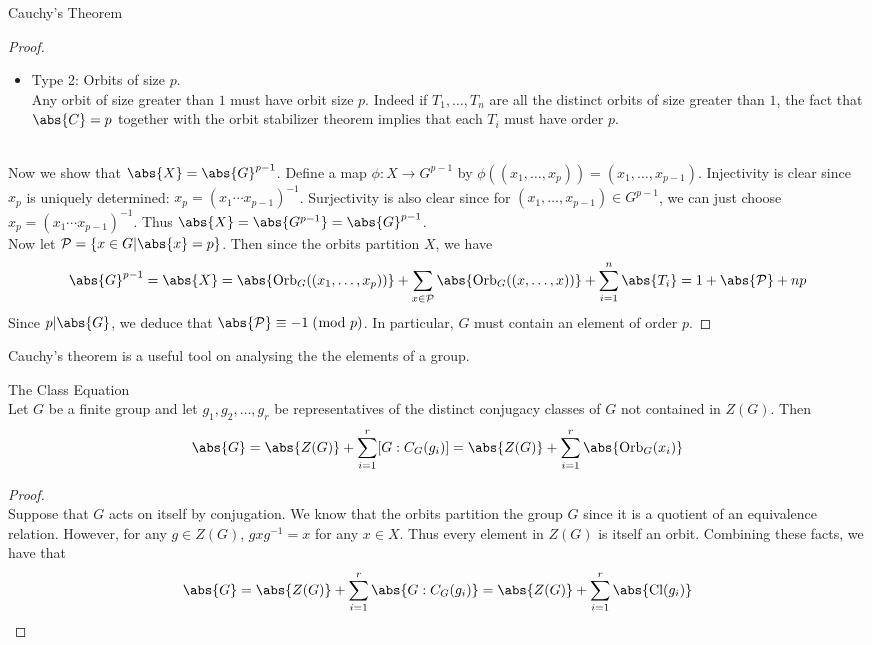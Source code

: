 \documentclass[a4paper]{article}
\begin{document}
\begin{thm}{Cauchy's Theorem}{}
\begin{proof}
\begin{itemize}
In fact, every orbit of size $1$ must be one of the above two cases. Suppose that $S$ is an orbit of size $1$. Let $(x_1,\dots,x_p)\in X$. Then the orbit stabilizer theorem implies that $\text{Stab}_C((x_1,\dots,x_p))=C$. Since $f=(1,\dots,p)\in C$, we have 
\begin{align*}
(x_1,\dots,x_p)&=f\cdot(x_1,\dots,x_p)\tag{$f\in\text{Stab}_C((x_1,\dots,x_p))$}\\
&=(x_2,\dots,x_p,x_1)
\end{align*} which means that $x_1=\dots=x_p$. This means that $x_1^p=1$. Since $p$ is a prime this means that $\abs{x_1}=1$ or $p$. In which either way it falls into one of the two above cases. 
\item Type 2: Orbits of size $p$. \\
Any orbit of size greater than $1$ must have orbit size $p$. Indeed if $T_1,\dots,T_n$ are all the distinct orbits of size greater than $1$, the fact that $\abs{C}=p$ together with the orbit stabilizer theorem implies that each $T_i$ must have order $p$. 
\end{itemize}~\\
Now we show that $\abs{X}=\abs{G}^{p-1}$. Define a map $\phi:X\to G^{p-1}$ by $\phi((x_1,\dots,x_p))=(x_1,\dots,x_{p-1})$. Injectivity is clear since $x_p$ is uniquely determined: $x_p=(x_1\cdots x_{p-1})^{-1}$. Surjectivity is also clear since for $(x_1,\dots,x_{p-1})\in G^{p-1}$, we can just choose $x_p=(x_1\cdots x_{p-1})^{-1}$. Thus $\abs{X}=\abs{G^{p-1}}=\abs{G}^{p-1}$. \\

Now let $\mathcal{P}=\{x\in G|\abs{x}=p\}$. Then since the orbits partition $X$, we have $$\abs{G}^{p-1}=\abs{X}=\abs{\text{Orb}_G((x_1,\dots,x_p))}+\sum_{x\in\mathcal{P}}\abs{\text{Orb}_G((x,\dots,x))}+\sum_{i=1}^n\abs{T_i}=1+\abs{\mathcal{P}}+np$$ Since $p|\abs{G}$, we deduce that $\abs{\mathcal{P}}\equiv-1\;(\bmod\;p)$. In particular, $G$ must contain an element of order $p$. 
\end{proof}
\end{thm}

Cauchy's theorem is a useful tool on analysing the the elements of a group. 

\begin{thm}{The Class Equation}{}\\
Let $G$ be a finite group and let $g_1,g_2,\dots,g_r$ be representatives of the distinct conjugacy classes of $G$ not contained in $Z(G)$. Then $$\abs{G}=\abs{Z(G)}+\sum_{i=1}^r[G:C_G(g_i)]=\abs{Z(G)}+\sum_{i=1}^r\abs{\text{Orb}_G(x_i)}$$ 
\begin{proof}\\
Suppose that $G$ acts on itself by conjugation. We know that the orbits partition the group $G$ since it is a quotient of an equivalence relation. However, for any $g\in Z(G)$, $gxg^{-1}=x$ for any $x\in X$. Thus every element in $Z(G)$ is itself an orbit. Combining these facts, we have that $$\abs{G}=\abs{Z(G)}+\sum_{i=1}^r\abs{G:C_G(g_i)}=\abs{Z(G)}+\sum_{i=1}^r\abs{\text{Cl}(g_i)}$$
\end{proof}
\end{thm}
\end{document}
